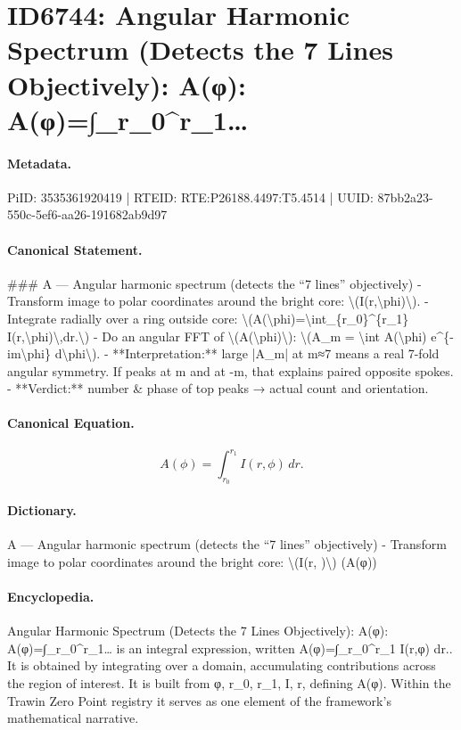 \section*{ID6744: Angular Harmonic Spectrum (Detects the 7 Lines Objectively): A(φ): A(φ)=∫\_r\_0\textasciicircum{}r\_1…}
\paragraph{Metadata.}
PiID: 3535361920419 | RTEID: RTE:P26188.4497:T5.4514 | UUID: 87bb2a23-550c-5ef6-aa26-191682ab9d97

\paragraph{Canonical Statement.}
\#\#\# A — Angular harmonic spectrum (detects the “7 lines” objectively) - Transform image to polar coordinates around the bright core: \textbackslash{}(I(r,\textbackslash{}phi)\textbackslash{}). - Integrate radially over a ring outside core: \textbackslash{}(A(\textbackslash{}phi)=\textbackslash{}int\_\{r\_0\}\textasciicircum{}\{r\_1\} I(r,\textbackslash{}phi)\textbackslash{},dr.\textbackslash{}) - Do an angular FFT of \textbackslash{}(A(\textbackslash{}phi)\textbackslash{}): \textbackslash{}(A\_m = \textbackslash{}int A(\textbackslash{}phi) e\textasciicircum{}\{-im\textbackslash{}phi\} d\textbackslash{}phi\textbackslash{}). - **Interpretation:** large |A\_m| at m≈7 means a real 7-fold angular symmetry. If peaks at m and at -m, that explains paired opposite spokes. - **Verdict:** number \& phase of top peaks → actual count and orientation.

\paragraph{Canonical Equation.}
\[
A(\phi)=\int_{r_0}^{r_1} I(r,\phi)\,dr.
\]

\paragraph{Dictionary.}
A — Angular harmonic spectrum (detects the “7 lines” objectively) - Transform image to polar coordinates around the bright core: \textbackslash{}(I(r, )\textbackslash{}) (A(φ))

\paragraph{Encyclopedia.}
Angular Harmonic Spectrum (Detects the 7 Lines Objectively): A(φ): A(φ)=∫\_r\_0\textasciicircum{}r\_1… is an integral expression, written A(φ)=∫\_r\_0\textasciicircum{}r\_1 I(r,φ) dr.. It is obtained by integrating over a domain, accumulating contributions across the region of interest. It is built from φ, r\_0, r\_1, I, r, defining A(φ). Within the Trawin Zero Point registry it serves as one element of the framework's mathematical narrative.
